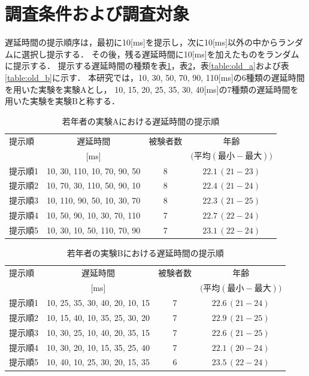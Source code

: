 \section{調査条件および調査対象}
遅延時間の提示順序は，最初に10[ms]を提示し，次に10[ms]以外の中からランダムに選択し提示する．
その後，残る遅延時間に10[ms]を加えたものをランダムに提示する．
提示する遅延時間の種類を表\ref{table:young_a}，表\ref{table:young_b}，表\ref{table:old_a}および表\ref{table:old_b}に示す．
本研究では，10, 30, 50, 70, 90, 110[ms]の6種類の遅延時間を用いた実験を実験Aとし，
10, 15, 20, 25, 35, 30, 40[ms]の7種類の遅延時間を用いた実験を実験Bと称する．
\begin{table}[tbp]
  \caption{若年者の実験Aにおける遅延時間の提示順}
  \label{table:young_a}
  \centering
  \begin{tabular}{lccc}
    \hline
    提示順 & 遅延時間 & 被験者数 & 年齢\\
    　& [ms] & & $\bigl(平均 (最小-最大)\bigr)$\\
    \hline \hline
    提示順1  & 10, 30, 110, 10, 70, 90, 50  & 8 & $22.1\, (21-23)$\\
    提示順2  & 10, 70, 30, 110, 50, 90, 10  & 8 & $22.4\, (21-24)$\\
    提示順3  & 10, 110, 90, 50, 10, 30, 70  & 8 & $22.3\, (21-25)$\\
    提示順4  & 10, 50, 90, 10, 30, 70, 110  & 7 & $22.7\, (22-24)$\\
    提示順5  & 10, 30, 10, 50, 110, 70, 90  & 7 & $23.1\, (22-24)$
\\
    \hline
  \end{tabular}
\end{table}
\begin{table}[tbp]
  \caption{若年者の実験Bにおける遅延時間の提示順}
  \label{table:young_b}
  \centering
  \begin{tabular}{lccc}
    \hline
    提示順 & 遅延時間 & 被験者数 & 年齢\\
    　& [ms] & & $\bigl(平均 (最小-最大)\bigr)$\\
    \hline \hline
    提示順1  & 10, 25, 35, 30, 40, 20, 10, 15  & 7 & $22.6\,(21-24)$\\
    提示順2  & 10, 15, 40, 10, 35, 25, 30, 20  & 7 & $22.9\,(21-25)$\\
    提示順3  & 10, 30, 25, 10, 40, 20, 35, 15  & 7 & $22.6\,(21-25)$\\
    提示順4  & 10, 30, 20, 10, 15, 35, 25, 40  & 7 & $22.1\,(20-24)$\\
    提示順5  & 10, 40, 10, 25, 30, 20, 15, 35  & 6 & $23.5\,(22-24)$
\\
    \hline
  \end{tabular}
\end{table}
